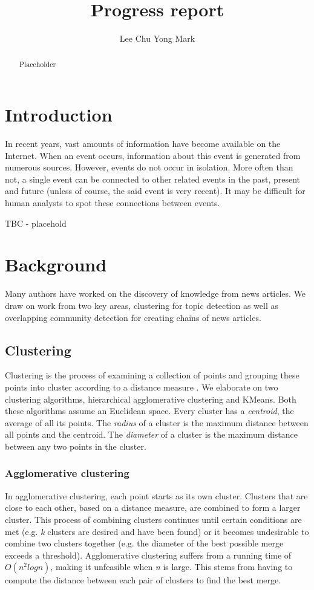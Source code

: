 \documentclass[12pt]{article}
\begin{document}
\title{Progress report}
\author{Lee Chu Yong Mark}
\maketitle

\begin{abstract}
Placeholder
\end{abstract}

\section{Introduction}
In recent years, vast amounts of information have become available on the Internet. When an event occurs, information about this event is generated from numerous sources. However, events do not occur in isolation. More often than not, a single event can be connected to other related events in the past, present and future (unless of course, the said event is very recent). It may be difficult for human analysts to spot these connections between events.

TBC - placehold

\section{Background}
Many authors have worked on the discovery of knowledge from news articles. We draw on work from two key areas, clustering for topic detection as well as overlapping community detection for creating chains of news articles.

\subsection{Clustering}
Clustering is the process of examining a collection of points and grouping these points into cluster according to a distance measure \cite{mining2012}. We elaborate on two clustering algorithms, hierarchical agglomerative clustering and KMeans. Both these algorithms assume an Euclidean space. Every cluster has a \textit{centroid}, the average of all its points. The \textit{radius} of a cluster is the maximum distance between all points and the centroid. The \textit{diameter} of a cluster is the maximum distance between any two points in the cluster.

\subsubsection{Agglomerative clustering}
In agglomerative clustering, each point starts as its own cluster. Clusters that are close to each other, based on a distance measure, are combined to form a larger cluster. This process of combining clusters continues until certain conditions are met (e.g. \textit{k} clusters are desired and have been found) or it becomes undesirable to combine two clusters together (e.g. the diameter of the best possible merge exceeds a threshold). Agglomerative clustering suffers from a running time of $O(n^2 log n)$, making it unfeasible when \textit{n} is large. This stems from having to compute the distance between each pair of clusters to find the best merge.
\end{document}
